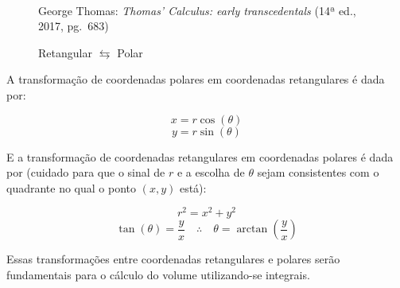 \begin{figure}[H]
  \begin{center}
    \caption{Retangular $\leftrightarrows$ Polar}
    \label{fig:retpol}
    \\
    \footnotesize{George Thomas: \emph{Thomas' Calculus: early transcedentals}
          (14ª ed., 2017, pg.\ 683)}
  \end{center}
\end{figure}

A transformação de coordenadas polares em coordenadas retangulares
é dada por:

\begin{equation}
  x = r \cos(\theta)
\end{equation}
\begin{equation}
  y = r \sin(\theta)
\end{equation}

E a transformação de coordenadas retangulares em coordenadas polares é
dada por (cuidado para que o sinal de $r$ e a escolha de $\theta$
sejam consistentes com o quadrante no qual o ponto $(x, y)$ está):

\begin{equation}
  r^2 = x^2 + y^2
\end{equation}
\begin{equation}
  \tan(\theta) = \frac{y}{x} \quad \therefore \quad \theta = \arctan\left(\frac{y}{x}\right)
\end{equation}

Essas transformações entre coordenadas retangulares e polares serão
fundamentais para o cálculo do volume utilizando-se integrais.
